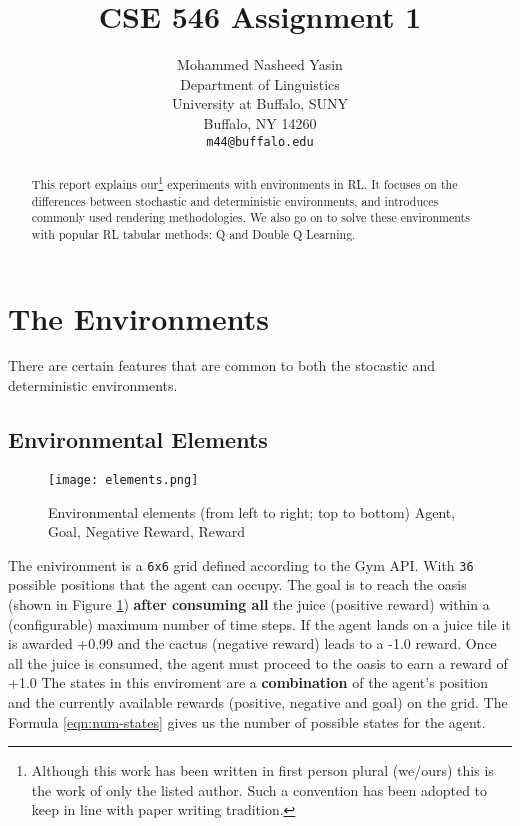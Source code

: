 \documentclass{article} %
\title{CSE 546 Assignment 1}
\author{
   Mohammed Nasheed Yasin \\
   Department of Linguistics\\
   University at Buffalo, SUNY\\
   Buffalo, NY 14260 \\
   \texttt{m44@buffalo.edu}
}
\begin{document}
\maketitle

\begin{abstract}
    This report explains our\footnote{Although this work has been written in first person plural (we/ours)
    this is the work of only the listed author. Such a convention has been adopted to keep
    in line with paper writing tradition.} experiments with environments in RL.
    It focuses on the differences between stochastic and deterministic environments,
    and introduces commonly used rendering methodologies. We also go on to solve these
    environments with popular RL tabular methods: Q and Double Q Learning.
\end{abstract}

\section{The Environments}
\label{sec:definition}

There are certain features that are common to both the stocastic and deterministic environments.

\subsection*{Environmental Elements}
\begin{figure}[h]
    \begin{center}
        \texttt{[image: elements.png]}
    \end{center}
    \caption{Environmental elements (from left to right; top to bottom) Agent, Goal,
        Negative Reward, Reward}
    \label{fig:elements}
\end{figure}

The enivironment is a \verb|6x6| grid defined according to the Gym \cite{1606.01540} API.
With \verb|36| possible positions that the agent can
occupy. The goal is to reach the oasis (shown in Figure \ref{fig:elements}) \textbf{after
consuming all} the juice (positive reward) within a (configurable) maximum number of time
steps. If the agent lands on a juice tile it is awarded +0.99 and the cactus (negative
reward) leads to a -1.0 reward. Once all the juice is consumed, the agent must proceed to the
oasis to earn a reward of +1.0
The states in this enviroment are a \textbf{combination} of the agent's position and the
currently available rewards (positive, negative and goal) on the grid. The Formula
\ref{eqn:num-states} gives us the number of possible states for the agent.
\end{document}
